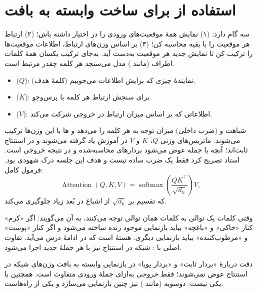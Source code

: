 \section{استفاده از  برای ساخت  وابسته به بافت}
\label{sec:attention}

 سه گام دارد: (۱) نمایش همهٔ موقعیت‌های ورودی را در اختیار داشته باش؛ (۲) ارتباط هر موقعیت را با بقیه محاسبه کن؛ (۳) بر اساس وزن‌های ارتباط، اطلاعات موقعیت‌ها را ترکیب کن تا نمایش جدید هر موقعیت به‌دست آید. به‌جای ترکیب یکسان همهٔ کلمات اطراف (مانند ) مدل می‌سنجد هر کلمه چقدر مرتبط است.

\begin{itemize}
  \item {} ($Q$): نمایندهٔ چیزی که برایش اطلاعات می‌جوییم (کلمهٔ هدف).
  \item {} ($K$): برای سنجش ارتباط هر کلمه با پرس‌وجو.
  \item {} ($V$): اطلاعاتی که بر اساس میزان ارتباط در خروجی شرکت می‌کند.
\end{itemize}
شباهت  و  (ضرب داخلی) میزان توجه به هر کلمه را می‌دهد و ها با این وزن‌ها ترکیب می‌شوند. ماتریس‌های وزنی $Q$، $K$ و $V$ در آموزش یاد گرفته می‌شوند و در استنتاج ثابت‌اند؛ آنچه با جمله عوض می‌شود بردارهای محاسبه‌شده و در نتیجه خروجی است. استاد تصریح کرد  فقط یک ضرب ساده نیست و هدف این جلسه درک شهودی بود. فرمول کامل:
\[
\operatorname{Attention}(Q,K,V)=\operatorname{softmax}\!\left(\frac{QK^{\top}}{\sqrt{d_k}}\right)V ,
\]
که تقسیم بر $\sqrt{d_k}$ از اشباع  در بُعد زیاد جلوگیری می‌کند.

وقتی کلمات یک توالی به کلمات همان توالی توجه می‌کنند، به آن  می‌گویند: اگر «کرم» کنار «خاکی» و «باغچه» بیاید بازنمایی موجود زنده ساخته می‌شود و اگر کنار «پوست» و «مرطوب‌کننده» بیاید بازنمایی دیگری.  هستهٔ  است که در ادامهٔ درس می‌آید. تفاوت اصلی با : شبکه در استنتاج نیز با هر جملهٔ جدید اجرا می‌شود.

\begin{correctionbox}{دقت دربارهٔ «بردار ثابت» و «بردار پویا»}
در بازنمایی وابسته به بافت وزن‌های شبکه در استنتاج عوض نمی‌شوند؛ فقط \emph{خروجی} به‌ازای جملهٔ ورودی متفاوت است. همچنین  با  یکی نیست:  دوسویه (مانند ) نیز چنین بازنمایی می‌سازد و  یکی از راه‌هاست.
\end{correctionbox}

